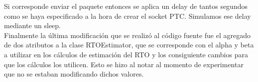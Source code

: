\indent Si corresponde enviar el paquete entonces se aplica un delay de tantos segundos como se haya especificado a la hora de crear el socket PTC. Simulamos ese delay mediante un sleep.\\

\indent Finalmente la última modificación que se realizó al código fuente fue el agregado de dos atributos a la clase RTOEstimator, que se corresponde con el alpha y beta a utilizar en los cálculos de estimación del RTO y los consiguiente cambios para que los cálculos los utilicen. Esto se hizo al notar al momento de experimentar que no se estaban modificando dichos valores.\\